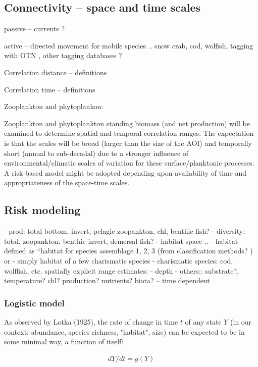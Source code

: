 \documentclass[letterpaper,portrait,11pt]{scrartcl}
\numberwithin{equation}{section}		%
\numberwithin{figure}{section}			%
\numberwithin{table}{section}				%
\begin{document}
\begin{itemize*}
\subsection{Connectivity -- space and time scales}

passive -- currents ?

active -- directed movement for mobile species .. snow crab, cod, wolfish, tagging with OTN , other tagging databases ?



Correlation distance
-- definitions

Correlation time 
-- definitions

Zooplankton and phytoplankon:

Zooplankton and phytoplankton standing biomass (and net production) will be examined to determine spatial and temporal correlation ranges. The expectation is that the scales will be broad (larger than the size of the AOI) and temporally short (annual to sub-decadal) due to a stronger influence of environmental/climatic scales of variation for these surface/planktonic processes. A risk-based model might be adopted depending upon availability of time and appropriateness of the space-time scales.





\subsection{Risk modeling}

- prod: total bottom, invert, pelagic zoopankton, chl, benthic fish?
- diversity: total, zoopankton, benthic invert, demersal fish?
- habitat space ..
- habitat defined as {``}habitat for species assemblage 1, 2, 3 (from classification methods? ) or
- simply habitat of a few charismatic species
- charismatic species: cod, wolffish, etc.
	spatially explicit range estimates:
- depth
- others:: substrate?, temperature? chl? production? nutrients? biota? -- time dependent


\subsubsection{Logistic model}

As observed by Lotka (1925), the rate of change in time $t$ of any state $Y$ (in our context: abundance, species richness, "habitat", size) can be expected to be in some minimal way, a function of itself:  

\begin{eqnarray} 
\label{eqLogisticContinuous}
dY / dt = g(Y)
\end{eqnarray}


\end{itemize*}
\end{document}
